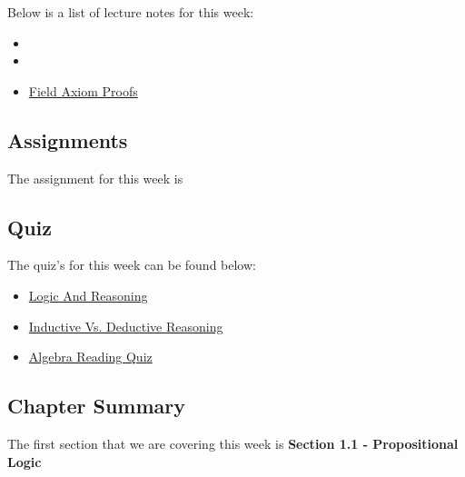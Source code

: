 \noindent Below is a list of lecture notes for this week:

\begin{itemize}
    \item {}
    \item {}
    \item \href{https://www.stumblingrobot.com/2015/06/29/prove-consequences-of-the-field-axioms/}{Field Axiom Proofs}
\end{itemize}

\subsection{Assignments}

The assignment for this week is   

\subsection{Quiz}

The quiz's for this week can be found below:

\begin{itemize}
    \item \href{https://applied.cs.colorado.edu/mod/quiz/view.php?id=51560}{Logic And Reasoning}  
    \item \href{https://www.dictionary.com/games/quizzes/is-it-inductive-or-deductive-a-reasoning-challenge}{Inductive Vs. Deductive Reasoning}  
    \item \href{https://applied.cs.colorado.edu/mod/quiz/view.php?id=51556}{Algebra Reading Quiz}  
\end{itemize}

\subsection{Chapter Summary}

The first section that we are covering this week is \textbf{Section 1.1 - Propositional Logic}

